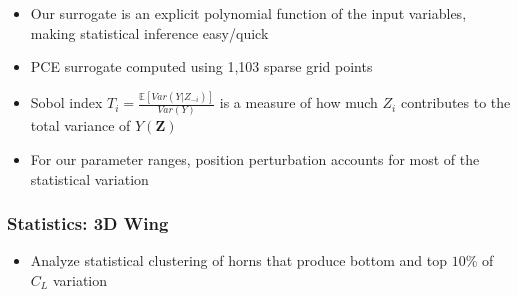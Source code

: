 \documentclass[9pt]{beamer}
\newcommand{\bv}[1]{\mathbf{#1}}
\begin{document}
\begin{frame}
\begin{itemize}
\item Our surrogate is an explicit polynomial function of the input
  variables, making statistical inference easy/quick
\item PCE surrogate computed using 1,103 sparse grid points
\item Sobol index $T_i = \frac{\mathbb{E}\left[ Var\left(
  Y|Z_{-i}\right)\right]}{Var\left( Y\right)}$ is a measure of how much
  $Z_i$ contributes to the total variance of $Y(\bv{Z})$
\item For our parameter ranges, position perturbation accounts for most of
  the statistical variation
\end{itemize}
\end{frame}
\begin{frame}
\frametitle{Statistics: 3D Wing}
\label{sec-2-9}


\begin{itemize}
\item Analyze statistical clustering of horns that produce bottom and top
  $10\%$ of $C_L$ variation
\end{itemize}


\end{frame}
\end{document}
